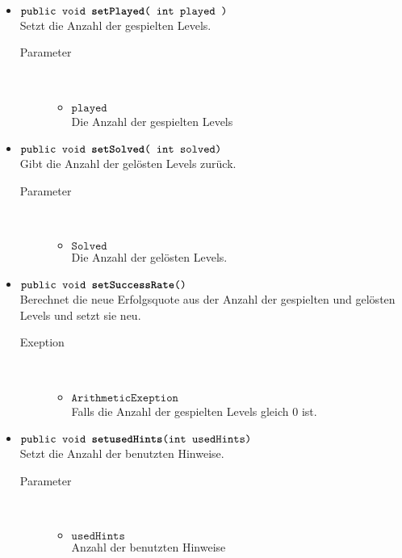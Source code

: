 \begin{description}
\begin{itemize}
\item $\texttt{public  void \textbf{setPlayed}( int played )}$ \\ Setzt die Anzahl der gespielten Levels.
				\begin{description}
				\item[Parameter] \hfill \\
					\vspace{-.8cm}
					\begin{itemize}
						\item $\texttt{played }$ \\ Die Anzahl der gespielten Levels
					\end{itemize}	
					\end{description}
					\item $\texttt{public  void  \textbf{setSolved}( int solved)}$ \\ Gibt die Anzahl der gelösten Levels zurück.
				\begin{description}
				\item[Parameter] \hfill \\
					\vspace{-.8cm}
					\begin{itemize}
						\item $\texttt{Solved }$ \\ Die Anzahl der gelösten Levels.
					\end{itemize}	
					\end{description}
			
			
			\item $\texttt{public  void \textbf{setSuccessRate}()}$ \\ Berechnet die neue Erfolgsquote aus der Anzahl der gespielten und gelösten Levels und setzt sie neu.
				\begin{description}
				\item[Exeption] \hfill \\
					\vspace{-.8cm}
					\begin{itemize}
						\item $\texttt{ArithmeticExeption }$ \\ Falls die Anzahl der gespielten Levels gleich 0 ist.
					\end{itemize}	
					\end{description}
			
\item $\texttt{public  void \textbf{setusedHints}(int usedHints)}$ \\ Setzt die Anzahl der benutzten Hinweise.
				\begin{description}
				\item[Parameter] \hfill \\
					\vspace{-.8cm}
					\begin{itemize}
						\item $\texttt{usedHints }$ \\ Anzahl der benutzten Hinweise
					\end{itemize}	
					\end{description}					
				

\end{itemize}
\end{description}
